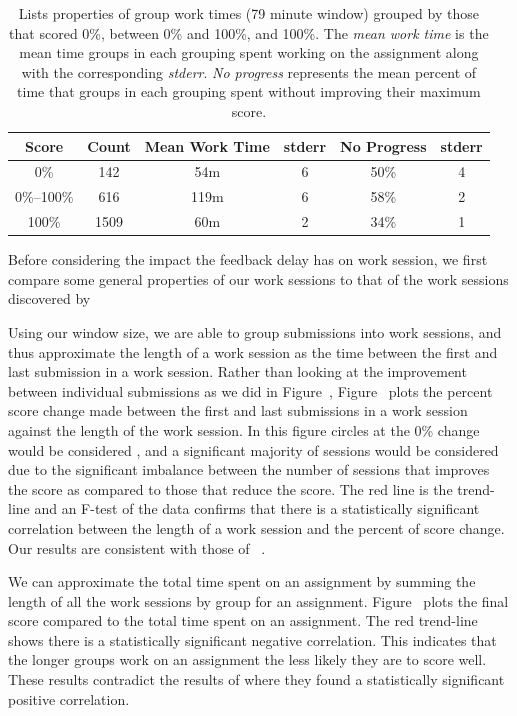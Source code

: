 \begin{table}
\centering
\begin{tabular}{|c||c|c|c|c|c|} \hline
Score & Count & Mean Work Time & stderr & No Progress & stderr \\ \hline \hline
0\% & 142 & 54m & 6 & 50\% & 4 \\ \hline
0\%--100\% & 616 & 119m & 6 & 58\% & 2 \\ \hline
100\% & 1509 & 60m & 2 & 34\% & 1 \\ \hline
\end{tabular}
\caption{Lists properties of group work times (79 minute window) grouped by
  those that scored 0\%, between 0\% and 100\%, and 100\%. The \emph{mean work
    time} is the mean time groups in each grouping spent working on the
  assignment along with the corresponding \emph{stderr}. \emph{No progress}
  represents the mean percent of time that groups in each grouping spent
  without improving their maximum score.}
\end{table}

Before considering the impact the feedback delay has on work session, we first
compare some general properties of our work sessions to that of the work
sessions discovered by \spacco[.]{}

Using our window size, we are able to group submissions into work sessions, and
thus approximate the length of a work session as the time between the first and
last submission in a work session. Rather than looking at the improvement
between individual submissions as we did in
Figure~, Figure~
plots the percent score change made between the first and last submissions in a
work session against the length of the work session. In this figure circles at
the 0\% change would be considered \noi{}, and a significant majority of
sessions would be considered \imp{} due to the significant imbalance between
the number of sessions that improves the score as compared to those that reduce
the score. The red line is the trend-line and an F-test of the data confirms
that there is a statistically significant correlation between the length of a
work session and the percent of score change. Our results are consistent with
those of \spacco{}~\cite{Spacco:2013:TIP:2462476.2465594}.

We can approximate the total time spent on an assignment by summing the length
of all the work sessions by group for an
assignment. Figure~ plots the final score compared to
the total time spent on an assignment. The red trend-line shows there is a
statistically significant negative correlation. This indicates that the longer
groups work on an assignment the less likely they are to score well. These
results contradict the results of \spacco{} where they found a statistically
significant positive correlation.

